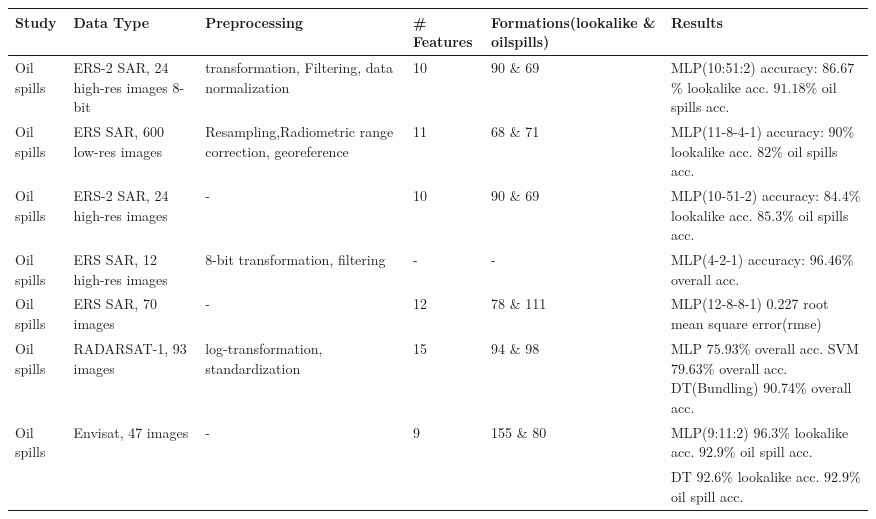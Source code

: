 \begin{table*}[t]

\advance\leftskip-3cm
\tabcolsep=0.19cm
\small
\centering


\begin{adjustbox}{width=\textwidth,totalheight=\textheight,keepaspectratio}
\begin{tabular}{*{6}{|l|}}

\toprule[1.5pt]
  \textbf{Study} & \textbf{Data Type} & \textbf{Preprocessing} & \# \textbf{Features} & \textbf{Formations(lookalike \& oilspills)} & \textbf{Results} \\
    \hline
     Oil spills\cite{Topouzelis200762} & ERS-2 SAR, 24 high-res images 8-bit & transformation, Filtering, data normalization & 10 & 90  \& 69  & MLP(10:51:2) accuracy: $86.67$\% lookalike acc. $91.18$\% oil spills acc.\\
        
        Oil spills\cite{Delfrate200038} & ERS SAR, 600 low-res images & Resampling,Radiometric range correction, georeference & 11 & 68  \& 71  & MLP(11-8-4-1) accuracy: $90$\% lookalike acc. $82$\% oil spills acc.\\
        
        Oil spills\cite{Topouzelis200930} &  ERS-2 SAR, 24 high-res images & - & 10 & 90 \& 69  & MLP(10-51-2) accuracy: $84.4$\% lookalike acc. $85.3$\% oil spills acc.\\
        
        Oil spills\cite{Topouzelis200924} &  ERS SAR, 12 high-res images & 8-bit transformation, filtering & - & - & MLP(4-2-1) accuracy: $96.46$\% overall acc. \\
     
        Oil spills\cite{Delfrate2004} &  ERS SAR, 70 images & - & 12 & 78 \& 111  & MLP(12-8-8-1) 0.227 root mean square error(rmse)\\
        
        Oil spills\cite{Xu201414} &  RADARSAT-1, 93 images & log-transformation, standardization & 15 & 94  \& 98  & MLP $75.93$\% overall acc. SVM $79.63$\% overall acc. DT(Bundling) 90.74\% overall acc.\\
        
        Oil spills\cite{Mera201472} &  Envisat, 47 images & - & 9 & 155  \& 80  & MLP(9:11:2) $96.3$\% lookalike acc. $92.9$\% oil spill acc. \\
        & & & & & DT $92.6$\% lookalike acc. $92.9$\% oil spill acc. \\
        

\end{tabular}
\end{adjustbox}
\end{table*}
